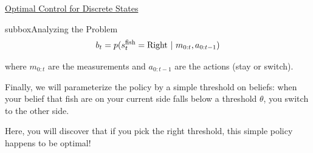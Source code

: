 \begin{textbox}{\href{https://compneuro.neuromatch.io/tutorials/W3D3_OptimalControl/student/W3D3_Tutorial1.html}{Optimal Control for Discrete States }   }
\begin{subbox}{subbox}{Analyzing the Problem}
\begin{equation}
b_t = p(s^{\rm fish}_t = {\rm Right}\  |\  m_{0:t}, a_{0:t-1})
\end{equation}

where $m_{0:t}$ are the measurements and $a_{0:t-1}$ are the actions (stay or switch).

Finally, we will parameterize the policy by a simple threshold on beliefs: when your belief that fish are on your current side falls below a threshold $\theta$, you switch to the other side.

Here, you will discover that if you pick the right threshold, this simple policy happens to be optimal!

\end{subbox}

\end{textbox}
